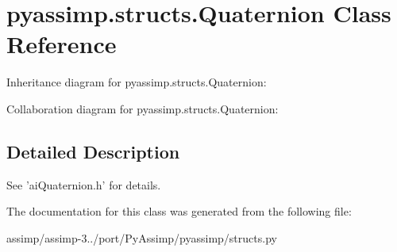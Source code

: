 \hypertarget{classpyassimp_1_1structs_1_1_quaternion}{\section{pyassimp.\+structs.\+Quaternion Class Reference}
\label{classpyassimp_1_1structs_1_1_quaternion}
}


Inheritance diagram for pyassimp.\+structs.\+Quaternion\+:


Collaboration diagram for pyassimp.\+structs.\+Quaternion\+:


\subsection{Detailed Description}
\begin{DoxyVerb}See 'aiQuaternion.h' for details.
\end{DoxyVerb}
 

The documentation for this class was generated from the following file\+:\begin{DoxyCompactItemize}
\item 
assimp/assimp-\/3../port/\+Py\+Assimp/pyassimp/structs.\+py\end{DoxyCompactItemize}
